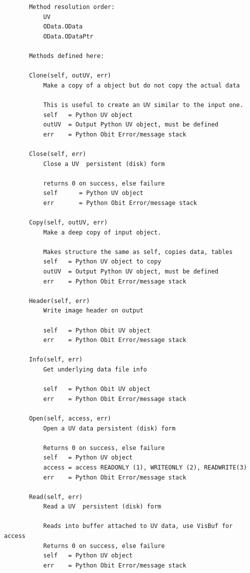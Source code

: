 \documentclass[11pt]{report}
\begin{document}
\begin{verbatim}
       Method resolution order:
           UV
           OData.OData
           OData.ODataPtr
       
       Methods defined here:
       
       Clone(self, outUV, err)
           Make a copy of a object but do not copy the actual data
           
           This is useful to create an UV similar to the input one.
           self   = Python UV object
           outUV  = Output Python UV object, must be defined
           err    = Python Obit Error/message stack
       
       Close(self, err)
           Close a UV  persistent (disk) form
           
           returns 0 on success, else failure
           self      = Python UV object
           err       = Python Obit Error/message stack
       
       Copy(self, outUV, err)
           Make a deep copy of input object.
           
           Makes structure the same as self, copies data, tables
           self   = Python UV object to copy
           outUV  = Output Python UV object, must be defined
           err    = Python Obit Error/message stack
       
       Header(self, err)
           Write image header on output
           
           self   = Python Obit UV object
           err    = Python Obit Error/message stack
       
       Info(self, err)
           Get underlying data file info
           
           self   = Python Obit UV object
           err    = Python Obit Error/message stack
       
       Open(self, access, err)
           Open a UV data persistent (disk) form
           
           Returns 0 on success, else failure
           self   = Python UV object
           access = access READONLY (1), WRITEONLY (2), READWRITE(3)
           err    = Python Obit Error/message stack
       
       Read(self, err)
           Read a UV  persistent (disk) form
           
           Reads into buffer attached to UV data, use VisBuf for access
           Returns 0 on success, else failure
           self   = Python UV object
           err    = Python Obit Error/message stack
       

\end{verbatim}
\end{document}
